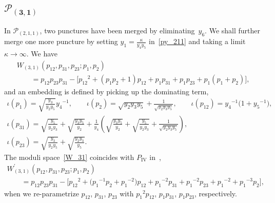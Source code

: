 \documentclass[10pt,a4paper]{amsart}
\numberwithin{equation}{section}
\begin{document}
\subsection[$\mathcal{P}_{(3,1)}$]{$\boldsymbol{\mathcal{P}_{(3,1)}}$}
In $\mathcal{P}_{(2,1,1)}$, two punctures have been merged by eliminating~$y_6$. We shall further merge one more puncture by setting $ y_1 = \frac{\kappa}{y_4 y_5}$ in~\eqref{py_211} and taking a limit $\kappa \to \infty$. We have
\begin{gather}
 W_{(3,1)}(p_{12}, p_{31}, p_{23}; p_1, p_2)\nonumber \\
\qquad{} = p_{12} p_{23} p_{31} - \big[ {p_{12}}^2 + ( p_1 p_2+1 ) p_{12} +p_1 p_{31} + p_1 p_{23} + p_1 ( p_1 + p_2 ) \big], \label{W_31}
\end{gather}
and an embedding is defined by picking up the dominating term,
\begin{gather}
 \iota(p_1) = \sqrt{\frac{y_3}{y_2 y_5}} {y_4}^{-1},\qquad \iota(p_2) = \sqrt{y_2 y_3 y_5} +\frac{1}{\sqrt{y_2 y_3 y_5}} ,\qquad
 \iota(p_{12}) = {y_4}^{-1} \big( 1 + {y_5}^{-1} \big) ,\nonumber \\
 \iota(p_{31}) = \sqrt{\frac{y_5}{y_2 y_3}} + \sqrt{\frac{y_3 y_5}{y_2}} +\frac{1}{y_4} \left( \sqrt{\frac{y_3 y_5}{y_2}} + \sqrt{\frac{y_5}{y_2 y_3}} + \frac{1}{\sqrt{y_2 y_3 y_5}} \right) , \nonumber\\
 \iota(p_{23}) = \sqrt{\frac{y_3}{y_2 y_5}} + \sqrt{\frac{y_2 y_3}{y_5}} . \label{py_31}
\end{gather}
The moduli space~\eqref{W_31} coincides with $P_{\mathrm{IV}}$
in~\cite{vdPutSaito09a},
\begin{gather*}
 W^\prime_{(3,1)}(p_{12}, p_{31}, p_{23}; p_1, p_2) \\
\qquad{} = p_{12} p_{23} p_{31} - \big[ {p_{12}}^2 + \big( {p_1}^{-1} p_2+ {p_1}^{-2} \big) p_{12} +{p_1}^{-2} p_{31} + {p_1}^{-2} p_{23} + {p_1}^{-2}+{p_1}^{-3} p_2 \big] ,
\end{gather*}
when we re-parametrize $p_{12}$, $p_{31}$, $p_{23}$ with ${p_1}^2 p_{12}$, $p_1 p_{31}$, $p_1 p_{23}$, respectively.
\end{document}
